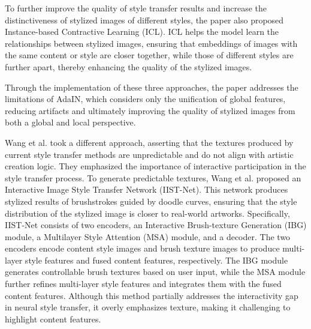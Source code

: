 \documentclass[preprint,12pt]{elsarticle}
\begin{document}
To further improve the quality of style transfer results and increase the distinctiveness of stylized images of different styles, the paper also proposed Instance-based Contractive Learning (ICL). ICL helps the model learn the relationships between stylized images, ensuring that embeddings of images with the same content or style are closer together, while those of different styles are further apart, thereby enhancing the quality of the stylized images.

Through the implementation of these three approaches, the paper addresses the limitations of AdaIN\citep{04huang2017arbitrary}, which considers only the unification of global features, reducing artifacts and ultimately improving the quality of stylized images from both a global and local perspective.

Wang et al.\citep{52wang2023interactive} took a different approach, asserting that the textures produced by current style transfer methods are unpredictable and do not align with artistic creation logic. They emphasized the importance of interactive participation in the style transfer process. To generate predictable textures, Wang et al. proposed an Interactive Image Style Transfer Network (IIST-Net). This network produces stylized results of brushstrokes guided by doodle curves, ensuring that the style distribution of the stylized image is closer to real-world artworks. Specifically, IIST-Net consists of two encoders, an Interactive Brush-texture Generation (IBG) module, a Multilayer Style Attention (MSA) module, and a decoder. The two encoders encode content style images and brush texture images to produce multi-layer style features and fused content features, respectively. The IBG module generates controllable brush textures based on user input, while the MSA module further refines multi-layer style features and integrates them with the fused content features. Although this method partially addresses the interactivity gap in neural style transfer, it overly emphasizes texture, making it challenging to highlight content features.
\end{document}
